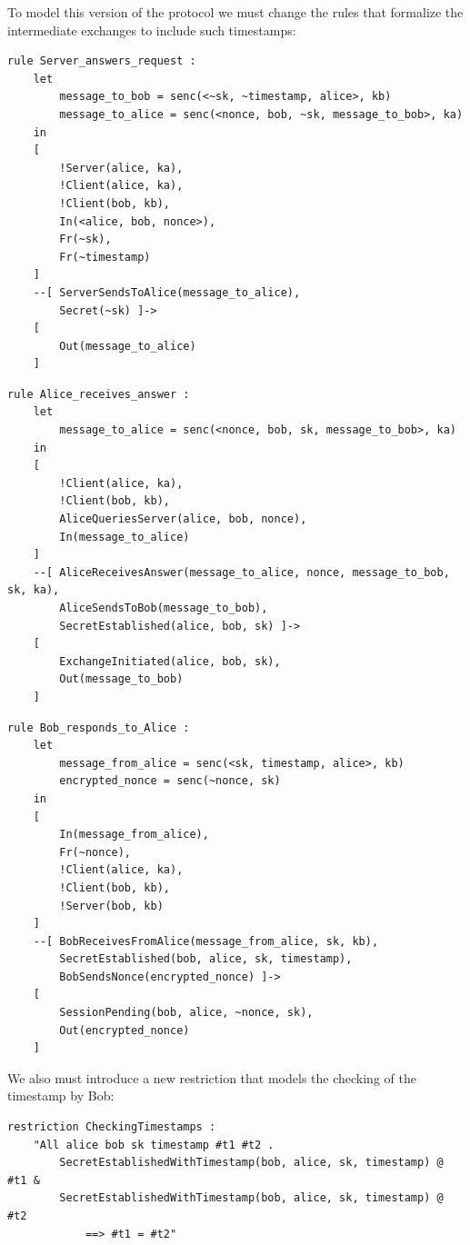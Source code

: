 \documentclass[fleqn,10pt]{SelfArx} %
\begin{document}
To model this version of the protocol we must change the rules that formalize the intermediate exchanges to include such timestamps:

\begin{lstlisting}[language=Tamarin]
rule Server_answers_request :
    let
        message_to_bob = senc(<~sk, ~timestamp, alice>, kb)
        message_to_alice = senc(<nonce, bob, ~sk, message_to_bob>, ka)
    in
    [
        !Server(alice, ka),
        !Client(alice, ka),
        !Client(bob, kb),
        In(<alice, bob, nonce>),
        Fr(~sk),
        Fr(~timestamp)
    ]
    --[ ServerSendsToAlice(message_to_alice),
        Secret(~sk) ]->
    [
        Out(message_to_alice)
    ]
\end{lstlisting}

\begin{lstlisting}[language=Tamarin]
rule Alice_receives_answer :
    let
        message_to_alice = senc(<nonce, bob, sk, message_to_bob>, ka)
    in
    [
        !Client(alice, ka),
        !Client(bob, kb),
        AliceQueriesServer(alice, bob, nonce),
        In(message_to_alice)
    ]
    --[ AliceReceivesAnswer(message_to_alice, nonce, message_to_bob, sk, ka),
        AliceSendsToBob(message_to_bob),
        SecretEstablished(alice, bob, sk) ]->
    [
        ExchangeInitiated(alice, bob, sk),
        Out(message_to_bob)
    ]
\end{lstlisting}

\begin{lstlisting}[language=Tamarin]
rule Bob_responds_to_Alice :
    let
        message_from_alice = senc(<sk, timestamp, alice>, kb)
        encrypted_nonce = senc(~nonce, sk)
    in
    [
        In(message_from_alice),
        Fr(~nonce),
        !Client(alice, ka),
        !Client(bob, kb),
        !Server(bob, kb)
    ]
    --[ BobReceivesFromAlice(message_from_alice, sk, kb),
        SecretEstablished(bob, alice, sk, timestamp),
        BobSendsNonce(encrypted_nonce) ]->
    [
        SessionPending(bob, alice, ~nonce, sk),
        Out(encrypted_nonce)
    ]
\end{lstlisting}

We also must introduce a new restriction that models the checking of the timestamp by Bob:

\begin{lstlisting}[language=Tamarin]
restriction CheckingTimestamps :
    "All alice bob sk timestamp #t1 #t2 .
        SecretEstablishedWithTimestamp(bob, alice, sk, timestamp) @ #t1 &
        SecretEstablishedWithTimestamp(bob, alice, sk, timestamp) @ #t2
            ==> #t1 = #t2"
\end{lstlisting}
\end{document}
